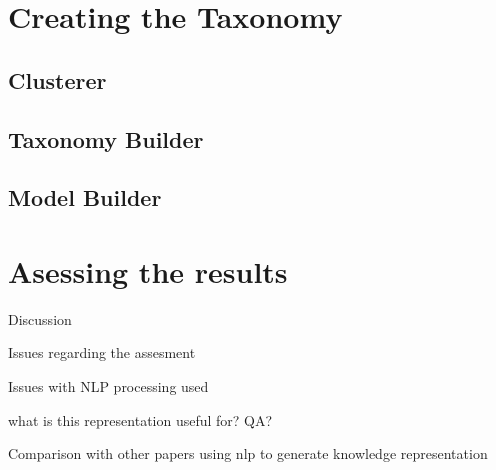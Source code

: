 \documentclass[4pt,a4paper,twocolumn]{article}
\begin{document}
	\section{Creating the Taxonomy}
		\subsection{Clusterer}
		\subsection{Taxonomy Builder}
		\subsection{Model Builder}


	\section{Asessing the results}

	

Discussion

Issues regarding the assesment

Issues with NLP processing used

what is this representation useful for? QA?

Comparison with other papers using nlp to generate knowledge representation







{}

\end{document}
